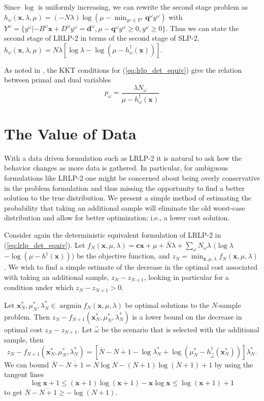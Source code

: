 \documentclass[11pt]{article}
\newcommand{\x}{\mathbf{x}}
\renewcommand{\c}{\mathbf{c}}
\newcommand{\q}{\mathbf{q}}
\renewcommand{\d}{\mathbf{d}}
\DeclareMathOperator*{\argmin}{argmin}
\begin{document}
Since $\log$ is uniformly increasing, we can rewrite the second stage problem as $h_\omega(\x,\lambda,\mu) = (-N\lambda) \log(\mu - \min_{y^\omega \in Y^\omega} \q^\omega y^\omega )$ with $Y^\omega = \{y^\omega | -B^\omega \x + D^\omega y^\omega = \d^\omega, \mu - \q^\omega y^\omega \geq 0, y^\omega \geq 0\}$.
Thus we can state the second stage of LRLP-2 in terms of the second stage of SLP-2, $h_\omega(\x,\lambda,\mu) = N\lambda\left[\log\lambda - \log(\mu - h^\dagger_\omega(\x))\right]$.

As noted in \cite{wang2010likelihood}, the KKT conditions for (\ref{eq:lrlp_det_equiv}) give the relation between primal and dual variables
\begin{equation}
	p_\omega = \frac{\lambda N_\omega}{\mu - h^\dagger_\omega(\x)} \label{eq:kkt}
\end{equation}

\section{The Value of Data} \label{sec:value}

With a data driven formulation such as LRLP-2 it is natural to ask how the behavior changes as more data is gathered.
In particular, for ambiguous formulations like LRLP-2 one might be concerned about being overly conservative in the problem formulation and thus missing the opportunity to find a better solution to the true distribution.
We present a simple method of estimating the probability that taking an additional sample will eliminate the old worst-case distribution and allow for better optimization; i.e., a lower cost solution.

Consider again the deterministic equivalent formulation of LRLP-2 in (\ref{eq:lrlp_det_equiv}).
Let $f_N(\x,\mu,\lambda) =  \c\x + \mu + \bar{N}\lambda + \sum_\omega N_\omega\lambda$ $(\log\lambda$ $- \log(\mu-h^\dagger(\x)))$ be the objective function, and $z_N = \min_{\x,\mu,\lambda} f_N(\x,\mu,\lambda)$.
We wish to find a simple estimate of the decrease in the optimal cost associated with taking an additional sample, $z_N - z_{N+1}$, looking in particular for a condition under which $z_N - z_{N+1} > 0$.

Let $\x^*_N, \mu^*_N,\lambda^*_N \in \argmin f_N(\x,\mu,\lambda)$ be optimal solutions to the $N$-sample problem.
Then $z_N - f_{N+1}(\x^*_N,\mu^*_N,\lambda^*_N)$ is a lower bound on the decrease in optimal cost $z_N - z_{N+1}$.
Let $\hat{\omega}$ be the scenario that is selected with the additional sample, then 
\[
	z_N - f_{N+1}(\x^*_N,\mu^*_N,\lambda^*_N) = \left[ \overline{N} - \overline{N+1} - \log \lambda^*_N + \log(\mu^*_N - h^\dagger_{\hat{\omega}}(\x^*_N)) \right] \lambda^*_N.
\]
We can bound $\overline{N} - \overline{N+1} = N\log N - (N+1)\log(N+1) + 1$ by using the tangent lines
\[
	\log \x + 1 \leq (\x+1)\log(\x+1) - \x\log \x \leq \log(\x+1) + 1
\]
to get $\overline{N} - \overline{N+1} \geq -\log(N+1)$.
\end{document}
